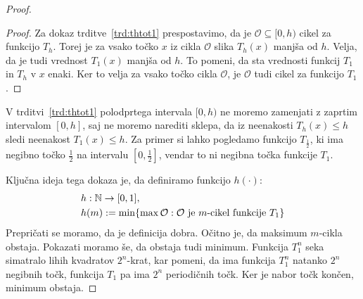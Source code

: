 \documentclass[../TG_magistrsko_delo_sections.tex]{subfiles}
\begin{document}
\begin{proof}
\begin{proof}
Za dokaz trditve~\ref{trd:thtot1} prespostavimo, da je $\mathcal{O} \subseteq [0, h)$ cikel za funkcijo $T_h$. Torej je za vsako točko $x$ iz cikla $\mathcal{O}$ slika $T_h(x)$ manjša od $h$. Velja, da je tudi vrednost $T_1(x)$ manjša od $h$. To pomeni, da sta vrednosti funkcij $T_1$ in $T_h$ v $x$ enaki. Ker to velja za vsako točko cikla $\mathcal{O}$, je $\mathcal{O}$ tudi cikel za funkcijo $T_1$.
\end{proof}
V trditvi~\ref{trd:thtot1} polodprtega intervala $[0, h)$ ne moremo zamenjati z zaprtim intervalom $[0, h]$, saj ne moremo narediti sklepa, da iz neenakosti $T_h(x) \leq h$ sledi neenakost $T_1(x) \leq h$. Za primer si lahko pogledamo funkcijo $T_{\frac{1}{2}}$, ki ima negibno točko $\frac{1}{2}$ na intervalu $[0, \frac{1}{2}]$, vendar to ni negibna točka funkcije $T_1$.

Ključna ideja tega dokaza je, da definiramo funkcijo $h(\cdot)$:
\begin{equation*}
\begin{split}
&h: \mathbb N \to [0, 1],\\
&h(m) := \min\{\max \mathcal{O}: \mathcal{O}\text{ je }m\text{-cikel funkcije }T_1 \}
\end{split}
\end{equation*}
Prepričati se moramo, da je definicija dobra. Očitno je, da maksimum $m$-cikla obstaja. Pokazati moramo še, da obstaja tudi minimum. Funkcija $T_1^n$ seka simatralo lihih kvadratov $2^n$-krat, kar pomeni, da ima funkcija $T_1^n$ natanko $2^n$ negibnih točk, funkcija $T_1$ pa ima $2^n$ periodičnih točk. Ker je nabor točk končen, minimum obstaja.


\end{proof}
\end{document}
